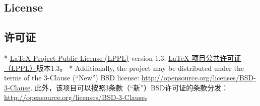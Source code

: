 \begin{paracol}{2}
\subsection*{License}
\switchcolumn
\subsection*{许可证}
\switchcolumn[0]*%
\href{http://www.latex-project.org/lppl.txt}{LaTeX Project Public License (LPPL)} version 1.3.
\switchcolumn
\href{http://www.latex-project.org/lppl.txt}{LaTeX 项目公共许可证（LPPL）}版本1.3。
\switchcolumn[0]*%
Additionally, the project may be distributed under the terms of the 3-Clause
(``New'') BSD license:  \url{http://opensource.org/licenses/BSD-3-Clause}.
\switchcolumn
此外，该项目可以按照3条款（“新”）BSD许可证的条款分发：\url{http://opensource.org/licenses/BSD-3-Clause}。

\pagebreak

\tableofcontents

\setlength{\fboxsep}{1ex}

\mbox{}\newpage

\end{paracol}